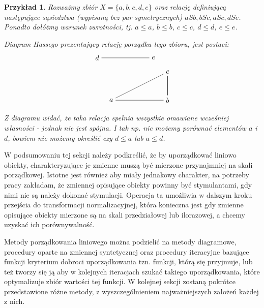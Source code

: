 \documentclass[12pt,a4paper]{report}
\newtheorem{example}{Przykład}
\begin{document}
\begin{example}
Rozważmy zbiór $X = \{a,b,c,d,e \}$ oraz relację definiującą następujące sąsiedztwa (wypisaną bez par symetrycznych) $aSb, bSc, aSc, dSe$. Ponadto dołóżmy warunek zwrotności, tj. $a \leq a$, $b \leq b$, $c \leq c$, $d \leq d$, $e \leq e$. 

Diagram Hassego prezentujący relację porządku tego zbioru, jest postaci:
$$
\begin{tikzpicture}[scale=.7]
  \node (a) at (-2,0) {$a$};
  \node (b) at (2,0) {$b$};
  \node (c) at (2,2) {$c$};
 \node (e) at (1,3) {$e$};
 \node (d) at (-3,3) {$d$};
  \draw (b)--(a) --(c)-- (b) -- (c); %
  \draw (d)--(e);
\end{tikzpicture}
$$
Z diagramu widać, że taka relacja spełnia wszystkie omawiane wcześniej własności - jednak nie jest spójna. I tak np. nie możemy porównać elementów $a$ i $d$, bowiem nie możemy określić czy  $d \leq a$ lub $a \leq d$.
\end{example}



W podsumowaniu tej sekcji należy podkreślić, że by uporządkować liniowo obiekty, charakteryzujące je zmienne muszą być mierzone przynajmniej na skali porządkowej. Istotne jest również aby miały jednakowy charakter, na potrzeby pracy zakładam, że zmiennej opisujące obiekty powinny być stymulantami, gdy nimi nie są należy dokonać stymulacji. Operacja ta umożliwia w dalszym kroku przejścia do transformacji normalizacyjnej, która konieczna jest gdy zmienne opisujące obiekty mierzone są na skali przedziałowej lub ilorazowej, a chcemy uzyskać ich porównywalność.

Metody porządkowania liniowego można podzielić na metody diagramowe, procedury oparte na zmiennej syntetycznej oraz procedury iteracyjne bazujące funkcji kryterium dobroci uporządkowania tzn. funkcji, którą się przyjmuje, lub też tworzy się ją aby w kolejnych iteracjach szukać takiego uporządkowania, które optymalizuje zbiór wartości tej funkcji. W kolejnej sekcji zostaną pokrótce przedstawione różne metody, z wyszczególnieniem najważniejszych założeń każdej z nich.
\end{document}

